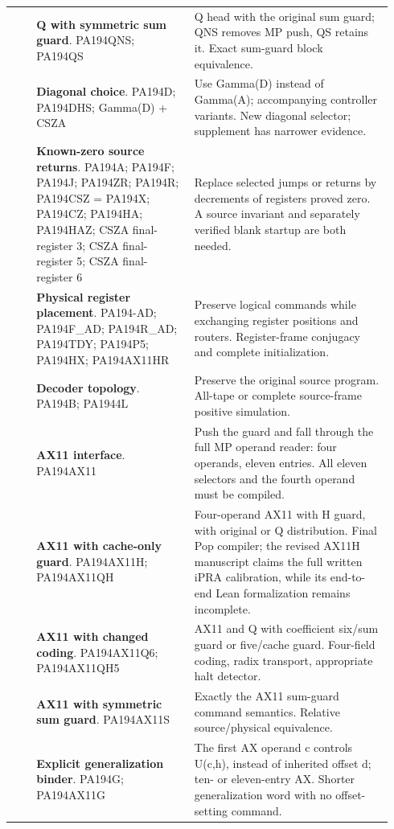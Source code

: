 \begin{longtable}{@{}>{\raggedright\arraybackslash}p{0.06\linewidth}>{\raggedright\arraybackslash}p{0.39\linewidth}>{\raggedright\arraybackslash}p{0.49\linewidth}@{}}
11 & \textbf{Q with symmetric sum guard}. PA194QNS; PA194QS & Q head with the original sum guard; QNS removes MP push, QS retains it. Exact sum-guard block equivalence.\\[5pt]
12 & \textbf{Diagonal choice}. PA194D; PA194DHS; Gamma(D) + CSZA & Use Gamma(D) instead of Gamma(A); accompanying controller variants. New diagonal selector; supplement has narrower evidence.\\[5pt]
13 & \textbf{Known-zero source returns}. PA194A; PA194F; PA194J; PA194ZR; PA194R; PA194CSZ = PA194X; PA194CZ; PA194HA; PA194HAZ; CSZA final-register 3; CSZA final-register 5; CSZA final-register 6 & Replace selected jumps or returns by decrements of registers proved zero. A source invariant and separately verified blank startup are both needed.\\[5pt]
14 & \textbf{Physical register placement}. PA194-AD; PA194F\_AD; PA194R\_AD; PA194TDY; PA194P5; PA194HX; PA194AX11HR & Preserve logical commands while exchanging register positions and routers. Register-frame conjugacy and complete initialization.\\[5pt]
15 & \textbf{Decoder topology}. PA194B; PA1944L & Preserve the original source program. All-tape or complete source-frame positive simulation.\\[5pt]
16 & \textbf{AX11 interface}. PA194AX11 & Push the guard and fall through the full MP operand reader: four operands, eleven entries. All eleven selectors and the fourth operand must be compiled.\\[5pt]
17 & \textbf{AX11 with cache-only guard}. PA194AX11H; PA194AX11QH & Four-operand AX11 with H guard, with original or Q distribution. Final Pop compiler; the revised AX11H manuscript claims the full written iPRA calibration, while its end-to-end Lean formalization remains incomplete.\\[5pt]
18 & \textbf{AX11 with changed coding}. PA194AX11Q6; PA194AX11QH5 & AX11 and Q with coefficient six/sum guard or five/cache guard. Four-field coding, radix transport, appropriate halt detector.\\[5pt]
19 & \textbf{AX11 with symmetric sum guard}. PA194AX11S & Exactly the AX11 sum-guard command semantics. Relative source/physical equivalence.\\[5pt]
20 & \textbf{Explicit generalization binder}. PA194G; PA194AX11G & The first AX operand c controls U(c,h), instead of inherited offset d; ten- or eleven-entry AX. Shorter generalization word with no offset-setting command.\\[5pt]

\end{longtable}
